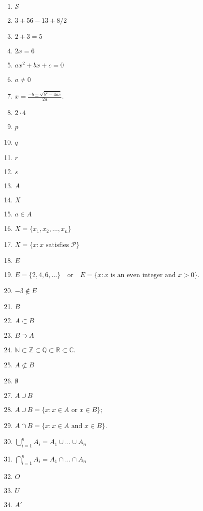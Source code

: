\documentclass[oneside,10pt,]{article}
\title{}
\date{}
\newcommand{\notsubset}{\not\subset}
\newcommand{\gt}{>}
\begin{document}
\hypertarget{g:article:idp1}{}
%
\begin{enumerate}
\item{}\(\mathcal S\)%
\item{}\(3 + 56 - 13 + 8/2 \)%
\item{}\(2 + 3 = 5\)%
\item{}\(2x = 6\)%
\item{}\(ax^2 + bx + c = 0\)%
\item{}\(a \neq 0\)%
\item{}\(x = \frac{-b \pm \sqrt{b^2 - 4ac}}{2a}\text{.}\)%
\item{}\(2 \cdot 4\)%
\item{}\(p\)%
\item{}\(q\)%
\item{}\(r\)%
\item{}\(s\)%
\item{}\(A\)%
\item{}\(X\)%
\item{}\(a \in A\)%
\item{}\(X = \{ x_1, x_2, \ldots, x_n \}\)%
\item{}\(X = \{ x :x \text{ satisfies }{\mathcal P}\}\)%
\item{}\(E\)%
\item{}\(E = \{2, 4, 6, \ldots \} \quad \text{or} \quad E = \{ x : x \text{ is an even integer and } x \gt 0 \}\text{.}\)%
\item{}\(-3 \notin E\)%
\item{}\(B\)%
\item{}\(A \subset B\)%
\item{}\(B \supset A\)%
\item{}\({\mathbb N} \subset {\mathbb Z} \subset {\mathbb Q} \subset {\mathbb R} \subset {\mathbb C}\text{.}\)%
\item{}\(A \notsubset B\)%
\item{}\(\emptyset\)%
\item{}\(A \cup B\)%
\item{}\(A \cup B = \{x : x \in A \text{ or } x \in B \};\)%
\item{}\(A \cap B = \{x :  x \in A \text{ and } x \in B \}\text{.}\)%
\item{}\(\bigcup_{i = 1}^{n} A_{i} = A_{1} \cup \ldots \cup A_n\)%
\item{}\(\bigcap_{i = 1}^{n} A_{i} = A_{1} \cap \ldots \cap A_n\)%
\item{}\(O\)%
\item{}\(U\)%
\item{}\(A'\)%

\end{enumerate}
\end{document}
